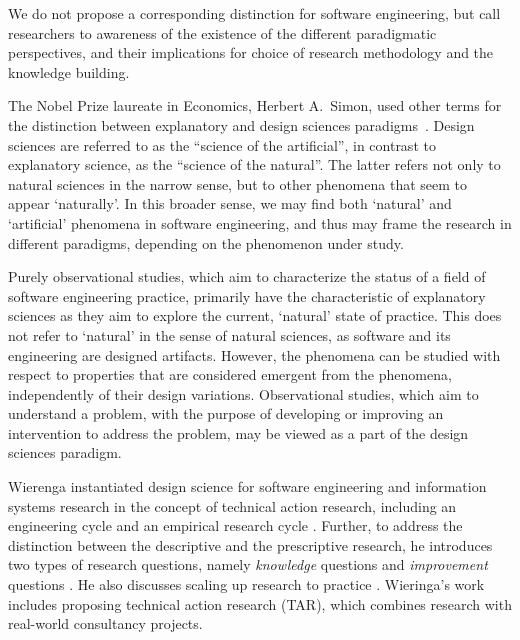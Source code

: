\documentclass[graybox]{svmult}
\newcommand{\per}[1]{\textcolor{cyan}{{\it [Per says: #1]}}}
\newcommand{\per}[1]{}
\begin{document}
We do not propose a corresponding distinction for software engineering, but call researchers to awareness of the existence of the different paradigmatic perspectives, and their implications for choice of research methodology and the knowledge building.

The Nobel Prize laureate in Economics, Herbert A.\ Simon, used other terms for the distinction between explanatory and design sciences paradigms~\cite{Simons69}. Design sciences are referred to as the ``science of the artificial'', in contrast to explanatory science, as the ``science of the natural''. The latter refers not only to natural sciences in the narrow sense, but to other phenomena that seem to appear `naturally'. In this broader sense, we may find both `natural' and `artificial' phenomena in software engineering, and thus may frame the research in different paradigms, depending on the phenomenon under study. 


Purely observational studies, which aim to characterize the status of a field of software engineering practice, primarily have the characteristic of explanatory sciences as they aim to explore the current, `natural'  state of practice. This does not refer to `natural' in the sense of natural sciences, as software and its engineering are designed artifacts. However, the phenomena can be studied with respect to properties that are considered emergent from the phenomena, independently of their design variations. Observational studies, which aim to understand a problem, with the purpose of developing or improving an intervention to address the problem, may be viewed as a part of the design sciences paradigm. 


Wierenga instantiated design science for software engineering and information systems research in the concept of technical action research, including an engineering cycle and an empirical research cycle \cite{wieringa_six_2015,wieringa_technical_2012,wieringa_what_2014}. Further, to address the distinction between the descriptive and the prescriptive research, he introduces two types of research questions, namely \emph{knowledge} questions and \emph{improvement} questions \cite{wieringa_design_2009}. He also discusses scaling up research to practice \cite{Wieringa2014}. Wieringa's work includes proposing technical action research (TAR), which combines research with real-world consultancy projects.



\end{document}
